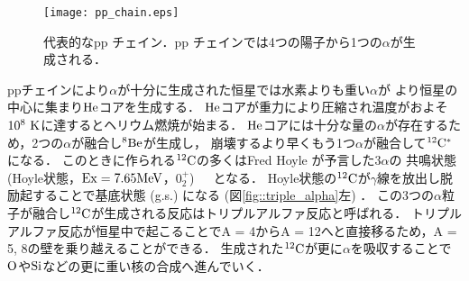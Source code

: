 \documentclass[../master]{subfiles}
\begin{document}
\begin{figure}
  \centering
  \texttt{[image: pp\_chain.eps]}
  \caption{代表的なpp チェイン．pp チェインでは4つの陽子から1つの$\alpha$が生成される．}
  \label{fig::pp_chain}
\end{figure}

ppチェインにより$\alpha$が十分に生成された恒星では水素よりも重い$\alpha$が
より恒星の中心に集まり${\rm He}$コアを生成する．
${\rm He}$コアが重力により圧縮され温度がおよそ$10^8~{\rm K}$に達するとヘリウム燃焼が始まる．
${\rm He}$コアには十分な量の$\alpha$が存在するため，2つの$\alpha$が融合し${}^{8}{\rm Be}$が生成し，
崩壊するより早くもう1つ$\alpha$が融合して${}^{12}{\rm C}^{*}$になる．
このときに作られる${}^{12}{\rm C}$の多くはFred Hoyle が予言した$3\alpha$の
共鳴状態 (Hoyle状態，${\rm Ex} = 7.65{\rm MeV}$，$0_{2}^{+}$)~\cite{hoyle_state}　となる．
Hoyle状態の${}^{12}{\rm C}$が$\gamma$線を放出し脱励起することで基底状態 (g.s.) になる (図\ref{fig::triple_alpha}左) ．
この3つの$\alpha$粒子が融合し${}^{12}{\rm C}$が生成される反応はトリプルアルファ反応と呼ばれる．
トリプルアルファ反応が恒星中で起こることでA = 4からA = 12へと直接移るため，A = 5, 8の壁を乗り越えることができる．
生成された${}^{12}{\rm C}$が更に$\alpha$を吸収することで${\rm O}$や${\rm Si}$などの更に重い核の合成へ進んでいく．
\end{document}
